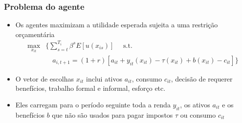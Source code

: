 \begin{frame}[label=model]
\frametitle{Problema do agente}
\begin{itemize}
    \item Os agentes maximizam a utilidade esperada sujeita a uma restrição orçamentária
    \begin{align*}
        \max_{x_{it}} &\Bigg\{\sum_{s=t}^{T_i}\beta^s E[ u(x_{is})]\quad \text{ s.t. } \\
         &\quad a_{i,t+1} =(1+r)[a_{it}+y_{it}(x_{it})-\tau(x_{it})+b(x_{it})-c_{it}]\Bigg\}
    \end{align*}
    \item O vetor de escolhas $x_{it}$ inclui ativos $a_{it}$, consumo $c_{it}$, decisão de requerer benefícios, trabalho formal e informal, esforço etc.
    \item Eles carregam para o período seguinte toda a renda $y_{it}$, os ativos $a_{it}$ e os benefícios $b$ que não são usados para pagar impostos $\tau$ ou consumo $c_{it}$
\end{itemize}
\end{frame}

